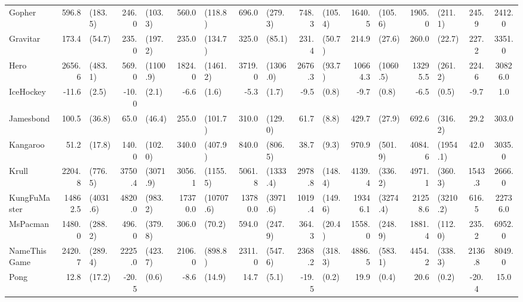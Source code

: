 \begin{landscape}
\begin{changemargin}{0cm}{0cm}
\begin{center}
\begin{table}[!htbp]
\begin{tabular}{l|rlrlrlrlrlrlrlcc}
Gopher         &    596.8 &    (183.5) &    246.0 &   (103.3) &      560.0 &      (118.8) &    696.0 &    (279.3) &    748.3 &  (105.4) &   1640.5 &    (105.6) &    1905.0 &    (211.1) &    245.9 &   2412.0 \\
Gravitar       &    173.4 &     (54.7) &    235.0 &   (197.2) &      235.0 &      (134.7) &    325.0 &     (85.1) &    231.4 &   (50.7) &    214.9 &     (27.6) &     260.0 &     (22.7) &    227.2 &   3351.0 \\
Hero           &   2656.6 &    (483.1) &    569.0 &  (1100.9) &     1824.0 &     (1461.2) &   3719.0 &   (1306.0) &   2676.3 &   (93.7) &  10664.3 &   (1060.5) &   13295.5 &    (261.2) &    224.6 &  30826.0 \\
IceHockey      &    -11.6 &      (2.5) &    -10.0 &     (2.1) &       -6.6 &        (1.6) &     -5.3 &      (1.7) &     -9.5 &    (0.8) &     -9.7 &      (0.8) &      -6.5 &      (0.5) &     -9.7 &      1.0 \\
Jamesbond      &    100.5 &     (36.8) &     65.0 &    (46.4) &      255.0 &      (101.7) &    310.0 &    (129.0) &     61.7 &    (8.8) &    429.7 &     (27.9) &     692.6 &    (316.2) &     29.2 &    303.0 \\
Kangaroo       &     51.2 &     (17.8) &    140.0 &   (102.0) &      340.0 &      (407.9) &    840.0 &    (806.5) &     38.7 &    (9.3) &    970.9 &    (501.9) &    4084.6 &   (1954.1) &     42.0 &   3035.0 \\
Krull          &   2204.8 &    (776.5) &   3750.4 &  (3071.9) &     3056.1 &     (1155.5) &   5061.8 &   (1333.4) &   2978.8 &  (148.4) &   4139.4 &    (336.2) &    4971.1 &    (360.3) &   1543.3 &   2666.0 \\
KungFuMaster   &  14862.5 &   (4031.6) &   4820.0 &   (983.2) &    17370.0 &    (10707.6) &  13780.0 &   (3971.6) &   1019.4 &  (149.6) &  19346.1 &   (3274.4) &   21258.6 &   (3210.2) &    616.5 &  22736.0 \\
MsPacman       &   1480.0 &    (288.2) &    496.0 &   (379.8) &      306.0 &       (70.2) &    594.0 &    (247.9) &    364.3 &   (20.4) &   1558.0 &    (248.9) &    1881.4 &    (112.0) &    235.2 &   6952.0 \\
NameThisGame   &   2420.7 &    (289.4) &   2225.0 &   (423.7) &     2106.0 &      (898.8) &   2311.0 &    (547.6) &   2368.2 &  (318.3) &   4886.5 &    (583.1) &    4454.2 &    (338.3) &   2136.8 &   8049.0 \\
Pong           &     12.8 &     (17.2) &    -20.5 &     (0.6) &       -8.6 &       (14.9) &     14.7 &      (5.1) &    -19.5 &    (0.2) &     19.9 &      (0.4) &      20.6 &      (0.2) &    -20.4 &     15.0 \\

\end{tabular}
\end{table}
\end{center}
\end{changemargin}
\end{landscape}
